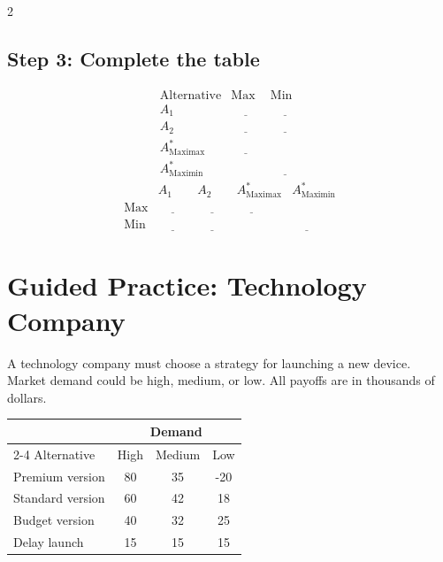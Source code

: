 \begin{multicols}{2}
		\subsection*{Step 3: Complete the table}
		\[
		\begin{array}{c|c|c}
			\text{Alternative} & \text{Max} & \text{Min}\\
			\hline
			A_1 & \underline{\hspace{1cm}} & \underline{\hspace{1cm}}\\
			A_2 & \underline{\hspace{1cm}} & \underline{\hspace{1cm}}\\
			\hline
			A^*_{\mathrm{Maximax}} & \underline{\hspace{1cm}} & \\
			A^*_{\mathrm{Maximin}} & & \underline{\hspace{1cm}}
		\end{array}
		\]\[
		\begin{array}{c|c|c|c|c}
			& A_1 & A_2 & A^*_{\mathrm{Maximax}} & A^*_{\mathrm{Maximin}}\\
			\hline
			\text{Max} & \underline{\hspace{1cm}} & \underline{\hspace{1cm}} & \underline{\hspace{1cm}} & \\
			\text{Min} & \underline{\hspace{1cm}} & \underline{\hspace{1cm}} & & \underline{\hspace{1cm}}
		\end{array}
		\]
		
		\section{Guided Practice: Technology Company}
		A technology company must choose a strategy for launching a new device.
		Market demand could be high, medium, or low. All payoffs are in thousands of dollars.
		\begin{center}
			\renewcommand{\arraystretch}{1.3}
			\small
			\begin{tabular}{lccc}
				\toprule
				& \multicolumn{3}{c}{Demand} \\
				\cmidrule(lr){2-4}
				Alternative & High & Medium & Low \\
				\midrule
				Premium version & 80 & 35 & -20 \\
				Standard version & 60 & 42 & 18 \\
				Budget version & 40 & 32 & 25 \\
				Delay launch & 15 & 15 & 15 \\
				\bottomrule
			\end{tabular}
		\end{center}
		\vspace{-5mm}

\end{multicols}
